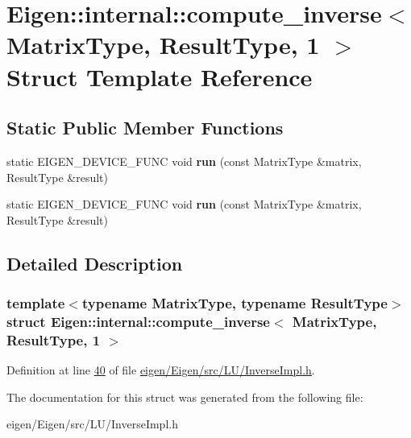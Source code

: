 \hypertarget{struct_eigen_1_1internal_1_1compute__inverse_3_01_matrix_type_00_01_result_type_00_011_01_4}{}\section{Eigen\+:\+:internal\+:\+:compute\+\_\+inverse$<$ Matrix\+Type, Result\+Type, 1 $>$ Struct Template Reference}
\label{struct_eigen_1_1internal_1_1compute__inverse_3_01_matrix_type_00_01_result_type_00_011_01_4}
\subsection*{Static Public Member Functions}
\begin{DoxyCompactItemize}
\item 
\mbox{\label{struct_eigen_1_1internal_1_1compute__inverse_3_01_matrix_type_00_01_result_type_00_011_01_4_a6ba9f9ce7e13e2da7a335b8460f211a7}} 
static E\+I\+G\+E\+N\+\_\+\+D\+E\+V\+I\+C\+E\+\_\+\+F\+U\+NC void {\bfseries run} (const Matrix\+Type \&matrix, Result\+Type \&result)
\item 
\mbox{\label{struct_eigen_1_1internal_1_1compute__inverse_3_01_matrix_type_00_01_result_type_00_011_01_4_a6ba9f9ce7e13e2da7a335b8460f211a7}} 
static E\+I\+G\+E\+N\+\_\+\+D\+E\+V\+I\+C\+E\+\_\+\+F\+U\+NC void {\bfseries run} (const Matrix\+Type \&matrix, Result\+Type \&result)
\end{DoxyCompactItemize}


\subsection{Detailed Description}
\subsubsection*{template$<$typename Matrix\+Type, typename Result\+Type$>$\newline
struct Eigen\+::internal\+::compute\+\_\+inverse$<$ Matrix\+Type, Result\+Type, 1 $>$}



Definition at line \hyperlink{eigen_2_eigen_2src_2_l_u_2_inverse_impl_8h_source_l00040}{40} of file \hyperlink{eigen_2_eigen_2src_2_l_u_2_inverse_impl_8h_source}{eigen/\+Eigen/src/\+L\+U/\+Inverse\+Impl.\+h}.



The documentation for this struct was generated from the following file\+:\begin{DoxyCompactItemize}
\item 
eigen/\+Eigen/src/\+L\+U/\+Inverse\+Impl.\+h\end{DoxyCompactItemize}
